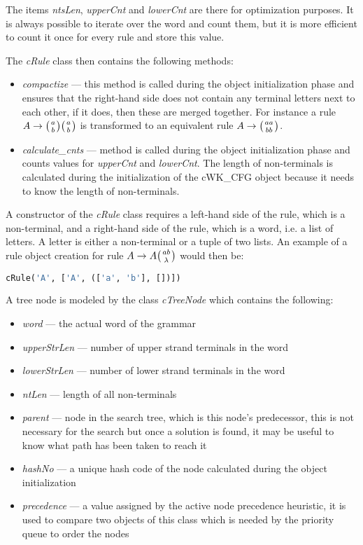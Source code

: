 The items \textit{ntsLen}, \textit{upperCnt} and \textit{lowerCnt} are there for optimization purposes. It is always possible to iterate over the word and count them, but it is more efficient to count it once for every rule and store this value.

The \textit{cRule} class then contains the following methods:
\begin{itemize}
  \item{\textit{compactize} --- this method is called during the object initialization phase and ensures that the right-hand side does not contain any terminal letters next to each other, if it does, then these are merged together. For instance a rule $A \rightarrow \wkpair{a}{b} \wkpair{a}{b}$ is transformed to an equivalent rule $A \rightarrow \wkpair{aa}{bb}$.}
  \item{\textit{calculate\_cnts} --- method is called during the object initialization phase and counts values for \textit{upperCnt} and \textit{lowerCnt}}. The length of non-terminals is calculated during the initialization of the cWK\_CFG object because it needs to know the length of non-terminals.
\end{itemize}

A constructor of the \textit{cRule} class requires a left-hand side of the rule, which is a non-terminal, and a right-hand side of the rule, which is a word, i.e. a list of letters. A letter is either a non-terminal or a tuple of two lists. An example of a rule object creation for rule $A \rightarrow A \wkpair{ab}{\lambda}$ would then be:

\begin{lstlisting}[language=Python]
  cRule('A', ['A', (['a', 'b'], [])])
\end{lstlisting}

\bigskip

A tree node is modeled by the class \textit{cTreeNode} which contains the following:
\begin{itemize}
  \item{\textit{word} --- the actual word of the grammar}
  \item{\textit{upperStrLen} --- number of upper strand terminals in the word}
  \item{\textit{lowerStrLen} --- number of lower strand terminals in the word}
  \item{\textit{ntLen} --- length of all non-terminals}
  \item{\textit{parent} --- node in the search tree, which is this node's  predecessor, this is not necessary for the search but once a solution is found, it may be useful to know what path has been taken to reach it}
  \item{\textit{hashNo} --- a unique hash code of the node calculated during the object initialization}
  \item{\textit{precedence} --- a value assigned by the active node precedence heuristic, it is used to compare two objects of this class which is needed by the priority queue to order the nodes}
\end{itemize}

